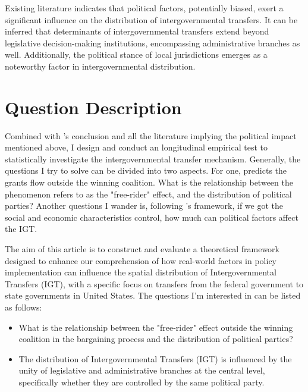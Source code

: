 \documentclass[man]{apa7}
\begin{document}
Existing literature indicates that political factors, potentially biased, exert a significant influence on the distribution of intergovernmental transfers. It can be inferred that determinants of intergovernmental transfers extend beyond legislative decision-making institutions, encompassing administrative branches as well. Additionally, the political stance of local jurisdictions emerges as a noteworthy factor in intergovernmental distribution.%

\section{Question Description}

Combined with \Textcite{martin2018dividing}'s conclusion and all the literature implying the political impact mentioned above, I design and conduct an longitudinal empirical test to statistically investigate the intergovernmental transfer mechanism. Generally, the questions I try to solve can be divided into two aspects. For one, \textcite{martin2018dividing} predicts the grants flow outside the winning coalition. What is the relationship between the phenomenon \textcite{martin2018dividing} refers to  as the "free-rider" effect, and the distribution of political parties? Another questions I wander is, following \textcite{markusen1981benefits}'s framework, if we got the social and economic characteristics control, how much can political factors affect the IGT.

The aim of this article is to construct and evaluate a theoretical framework designed to enhance our comprehension of how real-world factors in policy implementation can influence the spatial distribution of Intergovernmental Transfers (IGT), with a specific focus on transfers from the federal government to state governments in United States. The questions I'm interested in can be listed as follows:

\begin{itemize}
  \item  What is the relationship between the "free-rider" effect outside the winning coalition in the bargaining process and the distribution of political parties?
\end{itemize}

\begin{itemize}
  \item  The distribution of Intergovernmental Transfers (IGT) is influenced by the unity of legislative and administrative branches at the central level, specifically whether they are controlled by the same political party.
\end{itemize}
\end{document}

